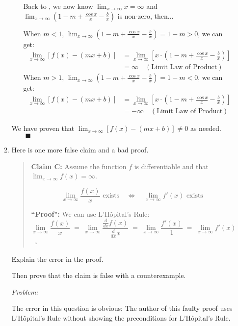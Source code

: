 \documentclass[12pt]{exam}
\newcommand*\circled[1]{\tikz[baseline=(char.base)]{
    \node[shape=circle, draw, inner sep=1pt, 
        minimum height=12pt] (char) {#1};}}
\newcommand {\DS} [1] {${\displaystyle #1}$}
\newcommand{\vv}{\vspace{.1cm}}
\begin{document}
\begin{enumerate}
\begin{enumerate}
\begin{itemize}
		    Back to \circled{5}, we now know $\lim_{x \to \infty}x=\infty$ and $\lim_{x \to \infty}(1-m+\frac{\cos{x}}{x}-\frac{b}{x})$ is non-zero, then...
		    
		    When $m<1$, $\lim_{x \to \infty}(1-m+\frac{\cos{x}}{x}-\frac{b}{x})=1-m>0$, we can get:
		    \begin{align*}
		        \lim_{x \to \infty}[f(x)-(mx+b)]&=\lim_{x \to \infty}[x\cdot(1-m+\frac{\cos{x}}{x}-\frac{b}{x})]\\
		        &=\infty\quad(\mbox{Limit Law of Product})
		    \end{align*}
		    When $m>1$, $\lim_{x \to \infty}(1-m+\frac{\cos{x}}{x}-\frac{b}{x})=1-m<0$, we can get:
		    \begin{align*}
		         \lim_{x \to \infty}[f(x)-(mx+b)]&=\lim_{x \to \infty}[x\cdot(1-m+\frac{\cos{x}}{x}-\frac{b}{x})]\\
		        &=-\infty\quad(\mbox{Limit Law of Product})
		    \end{align*}
		\end{itemize}
		We have proven that $\lim_{x \to \infty}[f(x)-(mx+b)]\neq0$ as needed. $\qquad\blacksquare$
		
		\newpage
		
		\item  Here is one more false claim and a bad proof.
			\begin{quotation}
				\noindent
				{\bf Claim C:} Assume the function $f$ is differentiable and that \DS{\lim_{x \to \infty} f(x) = \infty}.
				
				$$  \lim_{x \to \infty} \frac{f(x)}{x} \mbox{ exists} \quad \iff \quad \lim_{x \to \infty} f'(x) \mbox{ exists } $$
				
				
				\noindent
				{\bf ``Proof":}  We can use L'H\^{o}pital's Rule:
					$$
						\lim_{x \to \infty} \frac{f(x)}{x} \; = \; \lim_{x \to \infty} \frac{\frac{d}{dx} f(x)}{\frac{d}{dx} x} 
							\; = \; \lim_{x \to \infty} \frac{f'(x)}{1} \; = \; \lim_{x \to \infty} f'(x)
					$$
					\ \hfill $\square$
			\end{quotation}
			Explain the  error in the proof.
			
			Then prove that the claim is false with a counterexample.
			
			\vv
			
			\emph{Problem:}
			
			\vv
			
			The error in this question is obvious; The author of this faulty proof uses L'H\^{o}pital's Rule without showing the preconditions for L'H\^{o}pital's Rule.
			

\end{enumerate}
\end{enumerate}
\end{document}
